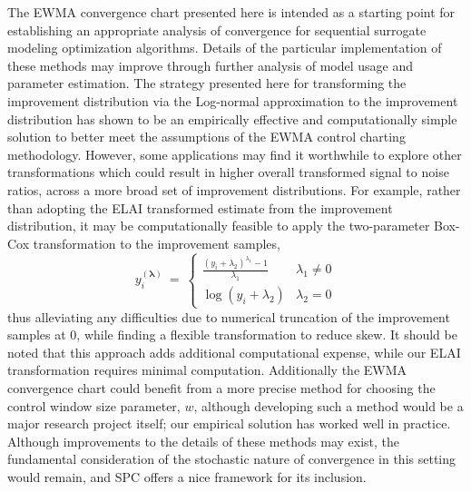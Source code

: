 \documentclass[12pt]{article}
\begin{document}
%
The EWMA convergence chart presented here is intended as a starting point for establishing an appropriate analysis of convergence for sequential surrogate modeling optimization algorithms.
Details of the particular implementation of these methods may improve through further analysis of model usage and parameter estimation. 
%
The strategy presented here for transforming the improvement distribution via the Log-normal approximation to the improvement distribution has shown to be an empirically effective and computationally simple solution to better meet the assumptions of the EWMA control charting methodology.
%
However, some applications may find it worthwhile to explore other transformations which could result in higher overall transformed signal to noise ratios, across a more broad set of improvement distributions. %
%
For example, rather than adopting the ELAI transformed estimate from the improvement distribution, it may be computationally feasible to apply the two-parameter Box-Cox transformation \citep{boxCox1964} to the improvement samples,
\begin{equation}
y_i^{(\bm{\lambda})}~=~
\begin{cases}
        \frac{( y_i + \lambda_2 )^{\lambda_1} - 1}{\lambda_1} & \lambda_1\neq0\\
        \log(y_i+\lambda_2) & \lambda_2=0
\end{cases}
\end{equation}
thus alleviating any difficulties due to numerical truncation of the improvement samples at 0, while finding a flexible transformation to reduce skew.
%
It should be noted that this approach adds additional computational expense, while our ELAI transformation requires minimal computation.   
Additionally the EWMA convergence chart could benefit from a more precise method for choosing the control window size parameter, $w$, although developing such a method would be a major research project itself; our empirical solution has worked well in practice.
%
Although improvements to the details of these methods may exist, the fundamental consideration of the stochastic nature of convergence in this setting would remain, and SPC offers a nice framework for its inclusion. %
\end{document}
